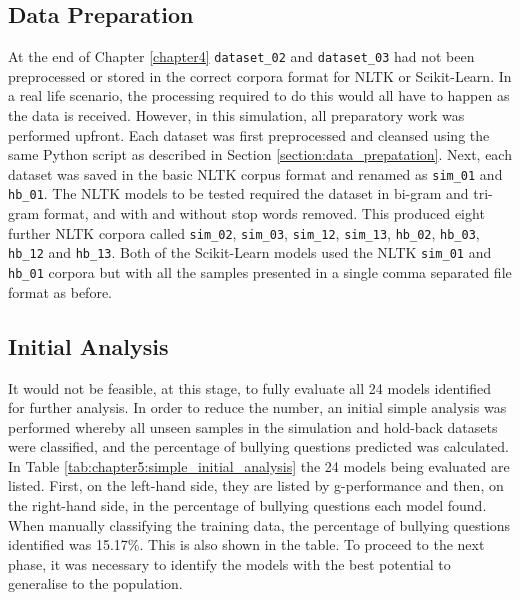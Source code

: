 \subsection{Data Preparation}
At the end of Chapter \ref{chapter4} \verb|dataset_02| and \verb|dataset_03| had not been preprocessed or stored in the correct corpora format for NLTK or Scikit-Learn. In a real life scenario, the processing required to do this would all have to happen as the data is received. However, in this simulation, all preparatory work was performed upfront. Each dataset was first preprocessed and cleansed using the same Python script as described in Section \ref{section:data_prepatation}. Next, each dataset was saved in the basic NLTK corpus format and renamed as \verb|sim_01| and \verb|hb_01|. The NLTK models to be tested required the dataset in bi-gram and tri-gram format, and with and without stop words removed. This produced eight further NLTK corpora called \verb|sim_02|, \verb|sim_03|, \verb|sim_12|, \verb|sim_13|, \verb|hb_02|, \verb|hb_03|, \verb|hb_12| and \verb|hb_13|. Both of the Scikit-Learn models used the NLTK \verb|sim_01| and \verb|hb_01| corpora but with all the samples presented in a single comma separated file format as before.

\subsection{Initial Analysis}
It would not be feasible, at this stage, to fully evaluate all 24 models identified for further analysis. In order to reduce the number, an initial simple analysis was performed whereby all unseen samples in the simulation and hold-back datasets were classified, and the percentage of bullying questions predicted was calculated. In Table \ref{tab:chapter5:simple_initial_analysis} the 24 models being evaluated are listed. First, on the left-hand side, they are listed by g-performance and then, on the right-hand side, in the percentage of bullying questions each model found. When manually classifying the training data, the percentage of bullying questions identified was 15.17\%. This is also shown in the table. To proceed to the next phase, it was necessary to identify the models with the best potential to generalise to the population. 

